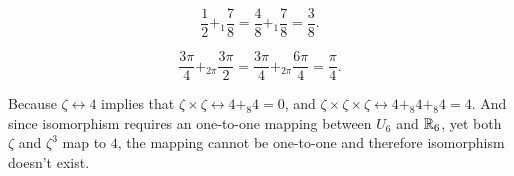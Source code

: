 \documentclass[12pt]{article}
\begin{document}
\begin{problem}[1.25]
	\[
	\frac{1}{2} +_1 \frac{7}{8} = \frac{4}{8} +_1 \frac{7}{8} =\frac{3}{8}
	.\] 
\end{problem}
\begin{problem}[1.26]
	\[
		\frac{3\pi}{4} +_{2\pi} \frac{3\pi}{2} = \frac{3\pi}{4} +_{2\pi} \frac{6\pi}{4} = \frac{\pi}{4}
	.\] 
\end{problem}

\begin{problem}[1.31]
	
\end{problem}

\begin{problem}[1.35]

\end{problem}

\begin{problem}[1.37]
Because $\zeta \leftrightarrow 4$ implies that $\zeta \times \zeta \leftrightarrow 4 +_{8} 4 = 0$, and $\zeta \times  \zeta \times \zeta \leftrightarrow 4+_{8} 4+_{8} 4 = 4$. And since isomorphism requires an one-to-one mapping between $U_6$ and $\mathbb{R}_6$, yet both $\zeta$ and $\zeta^3$ map to $4$, the mapping cannot be one-to-one and therefore isomorphism doesn't exist.
\end{problem}
\end{document}

